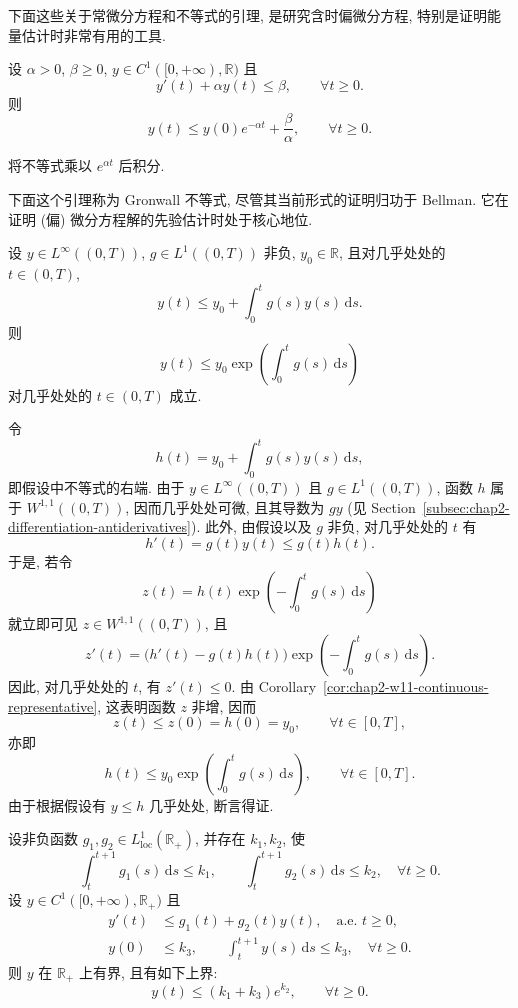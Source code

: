 下面这些关于常微分方程和不等式的引理, 是研究含时偏微分方程, 特别是证明能量估计时非常有用的工具.

\begin{Lemma}
\label{lem:chap2-linear-decay}
设 $\alpha>0$, $\beta\geq0$, $y\in C^1([0,+\infty),\mathbb{R})$ 且
\[
 y'(t)+\alpha y(t)\leq\beta,
 \qquad\forall t\geq0.
\]
则
\[
 y(t)\leq y(0)e^{-\alpha t}+\frac\beta\alpha,
 \qquad\forall t\geq0.
\]
\end{Lemma}

\begin{Proof}
将不等式乘以 $e^{\alpha t}$ 后积分.
\end{Proof}

下面这个引理称为 Gronwall 不等式, 尽管其当前形式的证明归功于 Bellman. 它在证明 (偏) 微分方程解的先验估计时处于核心地位.

\begin{Lemma}
\label{lem:chap2-gronwall}
设 $y\in L^\infty((0,T))$, $g\in L^1((0,T))$ 非负, $y_0\in\mathbb{R}$, 且对几乎处处的 $t\in(0,T)$,
\[
 y(t)\leq y_0+\int_0^t g(s)y(s)\,\mathrm{d}s.
\]
则
\[
 y(t)\leq y_0\exp\left(\int_0^t g(s)\,\mathrm{d}s\right)
\]
对几乎处处的 $t\in(0,T)$ 成立.
\end{Lemma}

\begin{Proof}
令
\[
 h(t)=y_0+\int_0^t g(s)y(s)\,\mathrm{d}s,
\]
即假设中不等式的右端. 由于 $y\in L^\infty((0,T))$ 且 $g\in L^1((0,T))$, 函数 $h$ 属于 $W^{1,1}((0,T))$, 因而几乎处处可微, 且其导数为 $gy$ (见 Section~\ref{subsec:chap2-differentiation-antiderivatives}). 此外, 由假设以及 $g$ 非负, 对几乎处处的 $t$ 有
\[
 h'(t)=g(t)y(t)\leq g(t)h(t).
\]
于是, 若令
\[
 z(t)=h(t)\exp\left(-\int_0^t g(s)\,\mathrm{d}s\right)
\]
就立即可见 $z\in W^{1,1}((0,T))$, 且
\[
 z'(t)=\bigl(h'(t)-g(t)h(t)\bigr)
 \exp\left(-\int_0^t g(s)\,\mathrm{d}s\right).
\]
因此, 对几乎处处的 $t$, 有 $z'(t)\leq0$. 由 Corollary~\ref{cor:chap2-w11-continuous-representative}, 这表明函数 $z$ 非增, 因而
\[
 z(t)\leq z(0)=h(0)=y_0,
 \qquad\forall t\in[0,T],
\]
亦即
\[
 h(t)\leq y_0\exp\left(\int_0^t g(s)\,\mathrm{d}s\right),
 \qquad\forall t\in[0,T].
\]
由于根据假设有 $y\leq h$ 几乎处处, 断言得证.
\end{Proof}

\begin{Lemma}
\label{lem:chap2-uniform-gronwall}
设非负函数 $g_1,g_2\in L^1_{\mathrm{loc}}(\mathbb{R}_+)$, 并存在 $k_1,k_2$, 使
\[
 \int_t^{t+1}g_1(s)\,\mathrm{d}s\leq k_1,
 \qquad\int_t^{t+1}g_2(s)\,\mathrm{d}s\leq k_2,
 \quad\forall t\geq0.
\]
设 $y\in C^1([0,+\infty),\mathbb{R}_+)$ 且
\begin{align}
 y'(t)&\leq g_1(t)+g_2(t)y(t),\quad\text{a.e. }t\geq0,
 \label{eq:chap2-uniform-gronwall-differential}\\
 y(0)&\leq k_3,\qquad \int_t^{t+1}y(s)\,\mathrm{d}s\leq k_3,
 \quad\forall t\geq0.
 \label{eq:chap2-uniform-gronwall-average}
\end{align}
则 $y$ 在 $\mathbb{R}_+$ 上有界, 且有如下上界:
\[
 y(t)\leq(k_1+k_3)e^{k_2},\qquad\forall t\geq0.
\]
\end{Lemma}

